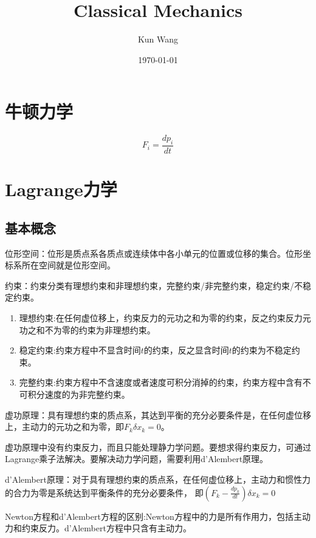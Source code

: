 \documentclass[12pt]{article}
\title{Classical Mechanics}
\author{Kun Wang}
\date{\today}
\numberwithin{equation}{section}
\begin{document}
        \maketitle
        \section{牛顿力学}
        \begin{equation}
            F_i=\frac{dp_i}{dt}
        \end{equation}

        \section{Lagrange力学}

        \subsection{基本概念\cite{2006shen}}

        位形空间：位形是质点系各质点或连续体中各小单元的位置或位移的集合。位形坐标系所在空间就是位形空间。

        约束：约束分类有理想约束和非理想约束，完整约束/非完整约束，稳定约束/不稳定约束。
        \begin{enumerate}
            \item 理想约束:在任何虚位移上，约束反力的元功之和为零的约束，反之约束反力元功之和不为零的约束为非理想约束。
            \item 稳定约束:约束方程中不显含时间$t$的约束，反之显含时间$t$的约束为不稳定约束。
            \item 完整约束:约束方程中不含速度或者速度可积分消掉的约束，约束方程中含有不可积分速度的为非完整约束。
        \end{enumerate}
        
        虚功原理：具有理想约束的质点系，其达到平衡的充分必要条件是，在任何虚位移上，主动力的元功之和为零，即$F_k\delta x_k=0$。

        虚功原理中没有约束反力，而且只能处理静力学问题。要想求得约束反力，可通过Lagrange乘子法解决。要解决动力学问题，需要利用d'Alembert原理。

        d'Alembert原理：对于具有理想约束的质点系，在任何虚位移上，主动力和惯性力的合力为零是系统达到平衡条件的充分必要条件，
        即$\left(F_k-\frac{dp_k}{dt}\right)\delta x_k=0$

        Newton方程和d'Alembert方程的区别:Newton方程中的力是所有作用力，包括主动力和约束反力。d'Alembert方程中只含有主动力。
\end{document}
